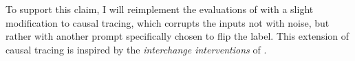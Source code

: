 \documentclass{article}
\begin{document}
To support this claim, I will reimplement the evaluations of \cite{hase2023does} with a slight modification to causal tracing, which corrupts the inputs not with noise, but rather with another prompt specifically chosen to flip the label. This extension of causal tracing is inspired by the \emph{interchange interventions} of \cite{geiger2023finding,wu2023interpretability}.

\printbibliography

\newpage
\appendix


\end{document}
